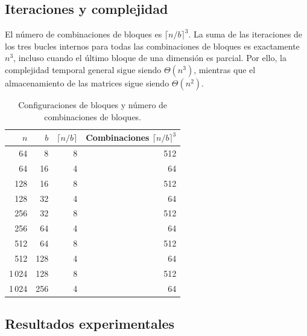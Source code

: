 \documentclass[a4paper,12pt]{article}
\begin{document}
\subsection{Iteraciones y complejidad}

El número de combinaciones de bloques es
\(\lceil n/b\rceil^3\). La suma de las iteraciones de los tres bucles internos
para todas las combinaciones de bloques es exactamente \(n^3\), incluso cuando
el último bloque de una dimensión es parcial. Por ello, la complejidad temporal
general sigue siendo \(\Theta(n^3)\), mientras que el almacenamiento de las
matrices sigue siendo \(\Theta(n^2)\).

\begin{table}[H]
    \centering
    \caption{Configuraciones de bloques y número de combinaciones de bloques.}
    \label{tab:block-iterations}
    \begin{tabular}{r r r r}
        \toprule
        \(n\) & \(b\) & \(\lceil n/b\rceil\) & Combinaciones \(\lceil n/b\rceil^3\) \\
        \midrule
        64  & 8  & 8 & 512 \\
        64  & 16 & 4 & 64 \\
        128 & 16 & 8 & 512 \\
        128 & 32 & 4 & 64 \\
        256 & 32 & 8 & 512 \\
        256 & 64 & 4 & 64 \\
        512 & 64 & 8 & 512 \\
        512 & 128 & 4 & 64 \\
        1\,024 & 128 & 8 & 512 \\
        1\,024 & 256 & 4 & 64 \\
        \bottomrule
    \end{tabular}
\end{table}

\subsection{Resultados experimentales}
\end{document}
